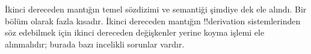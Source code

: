 


\begin{editorial}
İkinci dereceden mantığın temel sözdizimi ve semantiği şimdiye dek ele
alındı. Bir bölüm olarak fazla kısadır. İkinci dereceden mantığın
!!{derivation} sistemlerinden söz edebilmek için ikinci dereceden değişkenler
yerine koyma işlemi ele alınmalıdır; burada bazı incelikli sorunlar vardır.
\end{editorial}







\OLEndChapterHook

